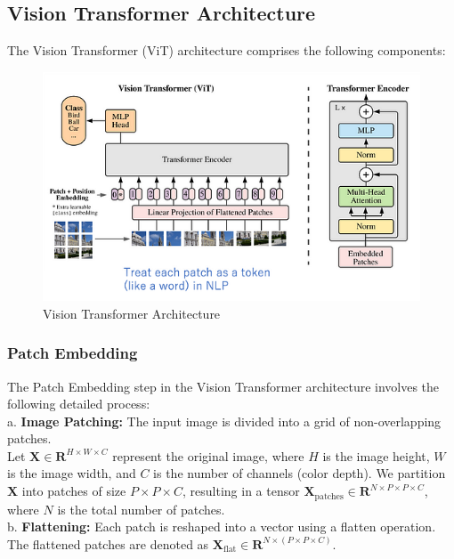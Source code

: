 \subsection{Vision Transformer Architecture}

The Vision Transformer (ViT) architecture comprises the following components:

\begin{figure}[htbp]
    \centering
    \includegraphics[width=6in]{img/visiontransformer.png}
    \caption{Vision Transformer Architecture}
\end{figure}

\item
\subsubsection{Patch Embedding}
The Patch Embedding step in the Vision Transformer architecture involves the following detailed process:
\\

\noindent a. \textbf{Image Patching:} The input image is divided into a grid of non-overlapping patches.\\
Let $\mathbf{X} \in \mathbf{R}^{H \times W \times C}$ represent the original image, where $H$ is the image height, $W$ is the image width, and $C$ is the number of channels (color depth). We partition $\mathbf{X}$ into patches of size $P \times P \times C$, resulting in a tensor $\mathbf{X}_\text{patches} \in \mathbf{R}^{N \times P \times P \times C}$, where $N$ is the total number of patches.
\\

\noindent b. \textbf{Flattening:} Each patch is reshaped into a vector using a flatten operation. The flattened patches are denoted as $\mathbf{X}_\text{flat} \in \mathbf{R}^{N \times (P \times P \times C)}$.
\\

